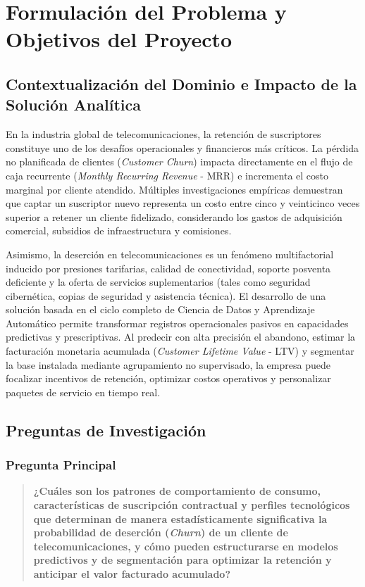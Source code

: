 \documentclass[11pt,letterpaper]{article}
\begin{document}
\section{Formulación del Problema y Objetivos del Proyecto}

\subsection{Contextualización del Dominio e Impacto de la Solución Analítica}
En la industria global de telecomunicaciones, la retención de suscriptores constituye uno de los desafíos operacionales y financieros más críticos. La pérdida no planificada de clientes (\textit{Customer Churn}) impacta directamente en el flujo de caja recurrente (\textit{Monthly Recurring Revenue} - MRR) e incrementa el costo marginal por cliente atendido. Múltiples investigaciones empíricas demuestran que captar un suscriptor nuevo representa un costo entre cinco y veinticinco veces superior a retener un cliente fidelizado, considerando los gastos de adquisición comercial, subsidios de infraestructura y comisiones.

Asimismo, la deserción en telecomunicaciones es un fenómeno multifactorial inducido por presiones tarifarias, calidad de conectividad, soporte posventa deficiente y la oferta de servicios suplementarios (tales como seguridad cibernética, copias de seguridad y asistencia técnica). El desarrollo de una solución basada en el ciclo completo de Ciencia de Datos y Aprendizaje Automático permite transformar registros operacionales pasivos en capacidades predictivas y prescriptivas. Al predecir con alta precisión el abandono, estimar la facturación monetaria acumulada (\textit{Customer Lifetime Value} - LTV) y segmentar la base instalada mediante agrupamiento no supervisado, la empresa puede focalizar incentivos de retención, optimizar costos operativos y personalizar paquetes de servicio en tiempo real.

\subsection{Preguntas de Investigación}

\subsubsection{Pregunta Principal}
\begin{quote}
    \textbf{¿Cuáles son los patrones de comportamiento de consumo, características de suscripción contractual y perfiles tecnológicos que determinan de manera estadísticamente significativa la probabilidad de deserción (\textit{Churn}) de un cliente de telecomunicaciones, y cómo pueden estructurarse en modelos predictivos y de segmentación para optimizar la retención y anticipar el valor facturado acumulado?}
\end{quote}
\end{document}
